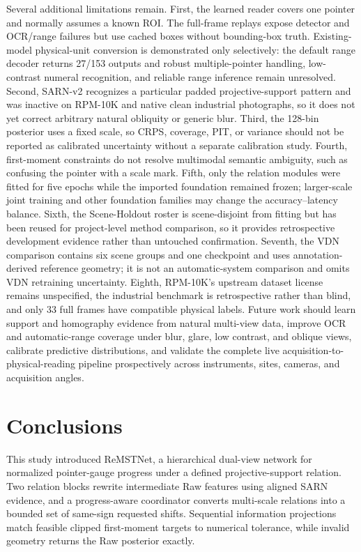\documentclass[electronics,article,submit,oneauthor]{Definitions/mdpi}
\newcommand{\modelname}{ReMSTNet}
\begin{document}
Several additional limitations remain. First, the learned reader covers one pointer and normally assumes a known ROI. The full-frame replays expose detector and OCR/range failures but use cached boxes without bounding-box truth. Existing-model physical-unit conversion is demonstrated only selectively: the default range decoder returns 27/153 outputs and robust multiple-pointer handling, low-contrast numeral recognition, and reliable range inference remain unresolved. Second, SARN-v2 recognizes a particular padded projective-support pattern and was inactive on RPM-10K and native clean industrial photographs, so it does not yet correct arbitrary natural obliquity or generic blur. Third, the 128-bin posterior uses a fixed scale, so CRPS, coverage, PIT, or variance should not be reported as calibrated uncertainty without a separate calibration study. Fourth, first-moment constraints do not resolve multimodal semantic ambiguity, such as confusing the pointer with a scale mark. Fifth, only the relation modules were fitted for five epochs while the imported foundation remained frozen; larger-scale joint training and other foundation families may change the accuracy--latency balance. Sixth, the Scene-Holdout roster is scene-disjoint from fitting but has been reused for project-level method comparison, so it provides retrospective development evidence rather than untouched confirmation. Seventh, the VDN comparison contains six scene groups and one checkpoint and uses annotation-derived reference geometry; it is not an automatic-system comparison and omits VDN retraining uncertainty. Eighth, RPM-10K's upstream dataset license remains unspecified, the industrial benchmark is retrospective rather than blind, and only 33 full frames have compatible physical labels. Future work should learn support and homography evidence from natural multi-view data, improve OCR and automatic-range coverage under blur, glare, low contrast, and oblique views, calibrate predictive distributions, and validate the complete live acquisition-to-physical-reading pipeline prospectively across instruments, sites, cameras, and acquisition angles.

\section{Conclusions}
\label{sec:conclusions}

This study introduced \modelname, a hierarchical dual-view network for normalized pointer-gauge progress under a defined projective-support relation. Two relation blocks rewrite intermediate Raw features using aligned SARN evidence, and a progress-aware coordinator converts multi-scale relations into a bounded set of same-sign requested shifts. Sequential information projections match feasible clipped first-moment targets to numerical tolerance, while invalid geometry returns the Raw posterior exactly.
\end{document}
